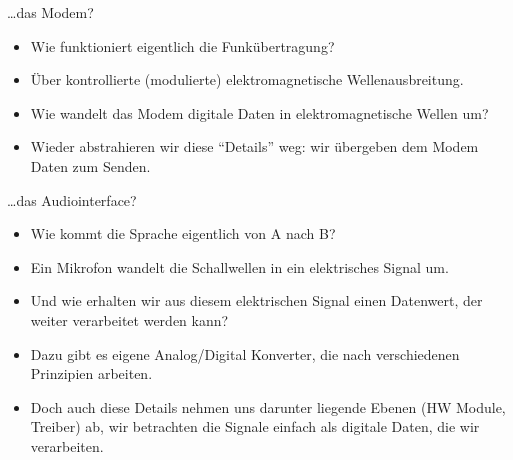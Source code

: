 \begin{frame}

	\begin{block}{\ldots das Modem?}
		\begin{itemize}
			\item Wie funktioniert eigentlich die Funkübertragung?
			\item Über kontrollierte (modulierte) elektromagnetische
				Wellenausbreitung.
			\item Wie wandelt das Modem digitale Daten in elektromagnetische
				Wellen um?
			\item Wieder abstrahieren wir diese ``Details'' weg: \alert<2->{wir
					übergeben dem Modem Daten zum Senden.}
		\end{itemize}
	\end{block}

\end{frame}

\begin{frame}

	\begin{block}{\ldots das Audiointerface?}
		\begin{itemize}
			\item Wie kommt die Sprache eigentlich von A nach B?
			\item Ein Mikrofon wandelt die Schallwellen in ein elektrisches
				Signal um.
			\item Und wie erhalten wir aus diesem elektrischen Signal einen Datenwert, der
				weiter verarbeitet werden kann?
			\item Dazu gibt es eigene Analog/Digital Konverter, die nach
				verschiedenen Prinzipien arbeiten.
			\item Doch auch diese Details nehmen uns darunter liegende Ebenen
				(HW Module, Treiber) ab, \alert<2->{wir betrachten die Signale
				einfach als digitale Daten, die wir verarbeiten.}
		\end{itemize}
	\end{block}
\end{frame}
